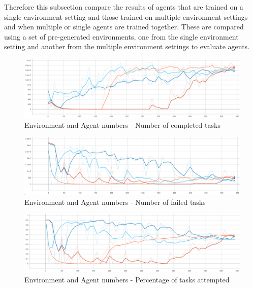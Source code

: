 Therefore this subsection compare the results of agents that are trained on a single environment setting and those
trained on multiple environment settings and when multiple or single agents are trained together. These are compared
using a set of pre-generated environments, one from the single environment setting and another from the multiple
environment settings to evaluate agents.

\begin{figure}[H]
    \centering
    \includegraphics[width=\linewidth]{figures/5_evaluation_figs/env_training_fig/num_completed_tasks.png}
    \caption{Environment and Agent numbers - Number of completed tasks}
    \label{fig:env_num_completed_tasks}
\end{figure}

\begin{figure}[H]
    \centering
    \includegraphics[width=\linewidth]{figures/5_evaluation_figs/env_training_fig/num_failed_tasks.png}
    \caption{Environment and Agent numbers - Number of failed tasks}
    \label{fig:env_num_failed_tasks}
\end{figure}

\begin{figure}[H]
    \centering
    \includegraphics[width=\linewidth]{figures/5_evaluation_figs/env_training_fig/percent_tasks.png}
    \caption{Environment and Agent numbers - Percentage of tasks attempted}
    \label{fig:env_percent_tasks}
\end{figure}

